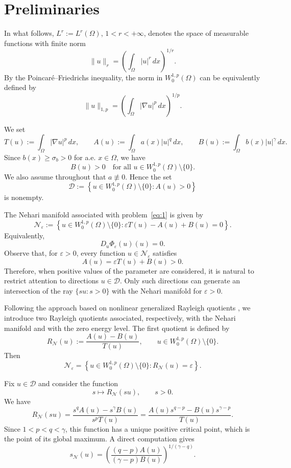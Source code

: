 \documentclass[preprint,11pt]{elsarticle}
\numberwithin{equation}{section}
\begin{document}


\section{Preliminaries}
\label{sec:3}

In what follows, \(L^r:=L^r(\Omega)\), \(1<r<+\infty\), denotes the space of
measurable functions with finite norm
\[
\|u\|_r
=
\left(\int_\Omega |u|^r\,dx\right)^{1/r}.
\]
By the Poincaré--Friedrichs inequality, the norm in \(W^{1,p}_0(\Omega)\) can
be equivalently defined by
\[
\|u\|_{1,p}
=
\left(\int_\Omega |\nabla u|^p\,dx\right)^{1/p}.
\]

We set
\[
T(u):=\int_\Omega |\nabla u|^p\,dx,
\qquad
A(u):=\int_\Omega a(x)|u|^q\,dx,
\qquad
B(u):=\int_\Omega b(x)|u|^\gamma\,dx .
\]
Since \(b(x)\ge\sigma_b>0\) for a.e. \(x\in\Omega\), we have
\[
B(u)>0
\quad
\text{for all }u\in W^{1,p}_0(\Omega)\setminus\{0\}.
\]
We also assume throughout that \(a\not\equiv0\). Hence the set
\[
\mathcal D
:=
\left\{
u\in W^{1,p}_0(\Omega)\setminus\{0\}: A(u)>0
\right\}
\]
is nonempty.

The Nehari manifold associated with problem~\eqref{eq:1} is given by
\[
\mathcal N_\varepsilon
:=
\left\{
u\in W^{1,p}_0(\Omega)\setminus\{0\}:
\varepsilon T(u)-A(u)+B(u)=0
\right\}.
\]
Equivalently,
\[
D_u\Phi_\varepsilon(u)(u)=0 .
\]
Observe that, for \(\varepsilon>0\), every function
\(u\in\mathcal N_\varepsilon\) satisfies
\[
A(u)=\varepsilon T(u)+B(u)>0.
\]
Therefore, when positive values of the parameter are considered, it is natural
to restrict attention to directions \(u\in\mathcal D\). Only such directions
can generate an intersection of the ray \(\{su:s>0\}\) with the Nehari
manifold for \(\varepsilon>0\).

Following the approach based on nonlinear generalized Rayleigh quotients
\cite{Ilyasov2022}, we introduce two Rayleigh quotients associated,
respectively, with the Nehari manifold and with the zero energy level. The
first quotient is defined by
\[
R_{\mathcal N}(u)
:=
\frac{A(u)-B(u)}{T(u)},
\qquad
u\in W^{1,p}_0(\Omega)\setminus\{0\}.
\]
Then
\[
\mathcal N_\varepsilon
=
\left\{
u\in W^{1,p}_0(\Omega)\setminus\{0\}:
R_{\mathcal N}(u)=\varepsilon
\right\}.
\]

Fix \(u\in\mathcal D\) and consider the function
\[
s\mapsto R_{\mathcal N}(su),
\qquad s>0.
\]
We have
\[
R_{\mathcal N}(su)
=
\frac{s^qA(u)-s^\gamma B(u)}{s^pT(u)}
=
\frac{A(u)s^{q-p}-B(u)s^{\gamma-p}}{T(u)} .
\]
Since \(1<p<q<\gamma\), this function has a unique positive critical point,
which is the point of its global maximum. A direct computation gives
\begin{equation}
	s_{\mathcal N}(u)
	=
	\left(
	\frac{(q-p)A(u)}
	{(\gamma-p)B(u)}
	\right)^{1/(\gamma-q)} .
	\label{eq:smu}
\end{equation}
\end{document}
